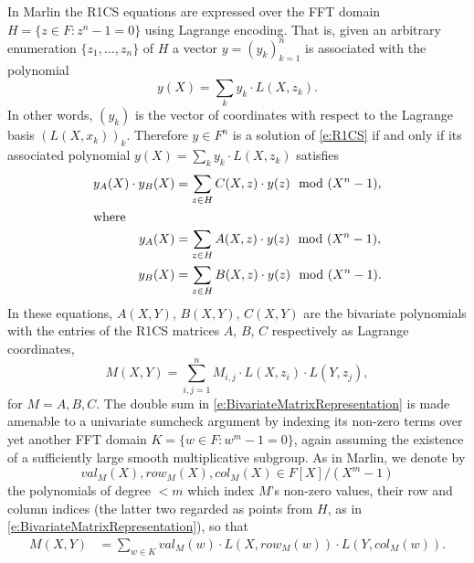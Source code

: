 \documentclass[10pt,article,oneside]{memoir}
\theoremstyle{definition}
\theoremstyle{remark}
\begin{document}
In Marlin the R1CS equations are expressed over the FFT domain $H=\{z\in F : z^n-1=0\}$ using Lagrange encoding.
That is, given an arbitrary enumeration $\{z_1,\ldots,z_n\}$ of $H$ a vector $y=(y_k)_{k=1}^n$ is associated with the polynomial 
\begin{equation}
\label{e:LagrangeRepresentation}
    y(X) =  \sum_k y_k \cdot L(X, z_k).
\end{equation}
In other words, $(y_k)$ is the vector of coordinates with respect to the Lagrange basis $(L(X,x_k))_k$. 
Therefore $y\in F^n$ is a solution of \eqref{e:R1CS} if and only if its associated polynomial $y(X) =  \sum_k y_k \cdot L(X, z_k)$ satisfies
\begin{align}
\label{e:QAPc}
y_A(X)\cdot y_B(X) & = \sum_{z\in H}  C(X,z)\cdot y(z) \mod (X^n-1),
\\
\intertext{where}
\label{e:QAPa}
y_A(X) &= \sum_{z\in H}  A(X,z)\cdot y(z) \mod (X^n-1),
\\
\label{e:QAPb}
y_B(X)  &= \sum_{z\in H}  B(X,z)\cdot y(z)  \mod (X^n-1).
\end{align}
In these equations,  $A(X,Y)$, $B(X,Y)$, $C(X,Y)$ are the bivariate polynomials with the entries of the R1CS matrices $A$, $B$, $C$ respectively as Lagrange coordinates, 
\begin{equation}
\label{e:BivariateMatrixRepresentation}
M(X,Y) =  \sum_{i,j=1}^n M_{i,j} \cdot L(X, z_i)\cdot L(Y, z_j),
\end{equation}
for $M=A,B,C$.
The double sum in \eqref{e:BivariateMatrixRepresentation} is made amenable to a univariate sumcheck argument by indexing its non-zero terms over yet another FFT domain  $K=\{ w\in F : w^m - 1 = 0\}$, again assuming the existence of a sufficiently large smooth multiplicative subgroup. 
As in Marlin, we denote by
\begin{equation}
\label{e:valANDrowANDcol}
val_M(X), row_M(X), col_M(X)\in F[X]/(X^m-1)
\end{equation} 
the polynomials of degree $<m$ which index $M$'s non-zero values, their row and column indices (the latter two regarded as points from $H$, as in \eqref{e:BivariateMatrixRepresentation}), so that   
\begin{align*}
M(X, Y) &= \sum_{w \in K } val_M(w) \cdot L(X , row_M(w)) \cdot L(Y, col_M(w)).
\end{align*}
\end{document}
